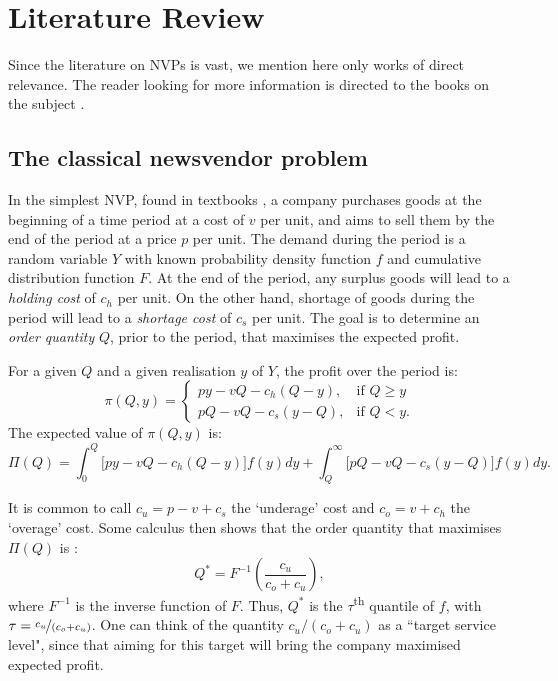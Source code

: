 \documentclass{article}
\begin{document}
\section{Literature Review} \label{se:lit}

Since the literature on NVPs is vast, we mention here only works of direct relevance. The reader looking for more information is directed to the books on the subject \cite{Ch12,Po02,SPP98,Zi00}.

\subsection{The classical newsvendor problem} %

In the simplest NVP, found in textbooks \cite{Ch12}, a company purchases goods at the beginning of a time period at a cost of $v$ per unit, and aims to sell them by the end of the period at a price $p$ per unit. The demand during the period is a random variable $Y$ with known probability density function $f$ and cumulative distribution function $F$. At the end of the period, any surplus goods will lead to a \emph{holding cost} of $c_h$ per unit. On the other hand, shortage of goods during the period will lead to a \emph{shortage cost} of $c_s$ per unit. The goal is to determine an \emph{order quantity} $Q$, prior to the period, that maximises the expected profit.

For a given $Q$ and a given realisation $y$ of $Y$, the profit over the period is:
\[
    \pi(Q,y)=
    \begin{cases}
        py-vQ-c_h(Q-y),& \text{if } Q\geq y\\
        pQ-vQ-c_s(y-Q),& \text{if } Q< y.
    \end{cases}
\]
The expected value of $\pi(Q,y)$ is:
\[
    \Pi(Q) = \int_{0}^{Q} \big[ py-vQ-c_h(Q-y) \big] f(y)dy + \int_{Q}^{\infty} \big[ pQ-vQ-c_s(y-Q) \big] f(y)dy.
\]

It is common to call $c_u= p-v+c_s$ the ‘underage’ cost and $c_o = v+c_h$ the ‘overage’ cost. Some calculus then shows that the order quantity that maximises $\Pi(Q)$ is \cite{Ch12}:
\[
    Q^* = F^{-1}\left( \frac{c_u}{c_o+c_u} \right),
\]
where $F^{-1}$ is the inverse function of $F$. Thus, $Q^*$ is the $\tau$\textsuperscript{th} quantile of $f$, with $\tau=\nicefrac{c_u}{(c_o+c_u)}$. One can think of the quantity
$c_u/(c_o+c_u)$ as a ``target service level", since that aiming for this target will bring the company maximised expected profit.
\end{document}
